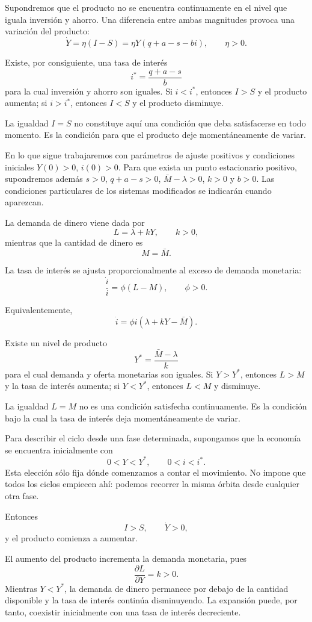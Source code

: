 \documentclass[10.5pt,twoside]{article}
\newcounter{rsec}
\newcommand{\rsection}{%
  \refstepcounter{rsec}%
  \par\vspace{1.35em}%
  \begin{center}\fontsize{14}{16}\selectfont\Roman{rsec}\end{center}%
  \vspace{0.35em}%
}
\begin{document}
Supondremos que el producto no se encuentra continuamente en el nivel que iguala inversión y ahorro. Una diferencia entre ambas magnitudes provoca una variación del producto:
\[
\dot Y=\eta(I-S)=\eta Y(q+a-s-bi),\qquad \eta>0.
\]

Existe, por consiguiente, una tasa de interés
\[
i^*=\frac{q+a-s}{b}
\]
para la cual inversión y ahorro son iguales. Si \(i<i^*\), entonces \(I>S\) y el producto aumenta; si \(i>i^*\), entonces \(I<S\) y el producto disminuye.

La igualdad \(I=S\) no constituye aquí una condición que deba satisfacerse en todo momento. Es la condición para que el producto deje momentáneamente de variar.

En lo que sigue trabajaremos con parámetros de ajuste positivos y condiciones iniciales $Y(0)>0$, $i(0)>0$. Para que exista un punto estacionario positivo, supondremos además $s>0$, $q+a-s>0$, $\bar M-\lambda>0$, $k>0$ y $b>0$. Las condiciones particulares de los sistemas modificados se indicarán cuando aparezcan.

\rsection
La demanda de dinero viene dada por
\[
L=\lambda+kY,\qquad k>0,
\]
mientras que la cantidad de dinero es
\[
M=\bar M.
\]

La tasa de interés se ajusta proporcionalmente al exceso de demanda monetaria:
\[
\frac{\dot i}{i}=\phi(L-M),\qquad \phi>0.
\]

Equivalentemente,
\[
\dot i=\phi i(\lambda+kY-\bar M).
\]

Existe un nivel de producto
\[
Y^*=\frac{\bar M-\lambda}{k}
\]
para el cual demanda y oferta monetarias son iguales. Si \(Y>Y^*\), entonces \(L>M\) y la tasa de interés aumenta; si \(Y<Y^*\), entonces \(L<M\) y disminuye.

La igualdad \(L=M\) no es una condición satisfecha continuamente. Es la condición bajo la cual la tasa de interés deja momentáneamente de variar.

\rsection
Para describir el ciclo desde una fase determinada, supongamos que la economía se encuentra inicialmente con
\[
0<Y<Y^*,\qquad 0<i<i^*.
\]
Esta elección sólo fija dónde comenzamos a contar el movimiento. No impone que todos los ciclos empiecen ahí: podemos recorrer la misma órbita desde cualquier otra fase.

Entonces
\[
I>S,\qquad \dot Y>0,
\]
y el producto comienza a aumentar.

El aumento del producto incrementa la demanda monetaria, pues
\[
\frac{\partial L}{\partial Y}=k>0.
\]
Mientras \(Y<Y^*\), la demanda de dinero permanece por debajo de la cantidad disponible y la tasa de interés continúa disminuyendo. La expansión puede, por tanto, coexistir inicialmente con una tasa de interés decreciente.
\end{document}
